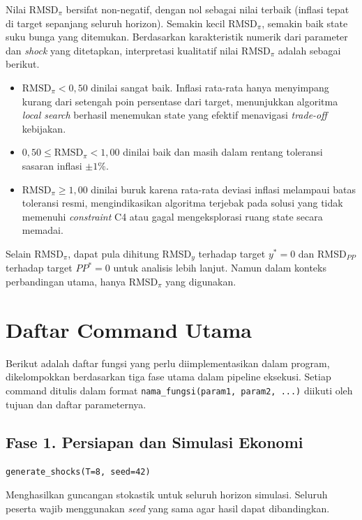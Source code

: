 Nilai RMSD$_{\pi}$ bersifat non-negatif, dengan nol sebagai nilai terbaik (inflasi tepat di target sepanjang seluruh horizon). Semakin kecil RMSD$_{\pi}$, semakin baik state suku bunga yang ditemukan. Berdasarkan karakteristik numerik dari parameter dan \textit{shock} yang ditetapkan, interpretasi kualitatif nilai RMSD$_{\pi}$ adalah sebagai berikut.

\begin{itemize}
    \item $\text{RMSD}_{\pi} < 0{,}50$ dinilai sangat baik. Inflasi rata-rata hanya menyimpang kurang dari setengah poin persentase dari target, menunjukkan algoritma \textit{local search} berhasil menemukan state yang efektif menavigasi \textit{trade-off} kebijakan.
    \item $0{,}50 \leq \text{RMSD}_{\pi} < 1{,}00$ dinilai baik dan masih dalam rentang toleransi sasaran inflasi $\pm 1\%$.
    \item $\text{RMSD}_{\pi} \geq 1{,}00$ dinilai buruk karena rata-rata deviasi inflasi melampaui batas toleransi resmi, mengindikasikan algoritma terjebak pada solusi yang tidak memenuhi \textit{constraint} C4 atau gagal mengeksplorasi ruang state secara memadai.
\end{itemize}

Selain RMSD$_{\pi}$, dapat pula dihitung RMSD$_{y}$ terhadap target $y^{*} = 0$ dan RMSD$_{PP}$ terhadap target $PP^{*} = 0$ untuk analisis lebih lanjut. Namun dalam konteks perbandingan utama, hanya RMSD$_{\pi}$ yang digunakan.

\section{Daftar Command Utama}

Berikut adalah daftar fungsi yang perlu diimplementasikan dalam program, dikelompokkan berdasarkan tiga fase utama dalam pipeline eksekusi. Setiap command ditulis dalam format \texttt{nama\_fungsi(param1, param2, ...)} diikuti oleh tujuan dan daftar parameternya.

\subsection*{Fase 1. Persiapan dan Simulasi Ekonomi}

\texttt{generate\_shocks(T=8, seed=42)}

Menghasilkan guncangan stokastik untuk seluruh horizon simulasi. Seluruh peserta wajib menggunakan \textit{seed} yang sama agar hasil dapat dibandingkan.

